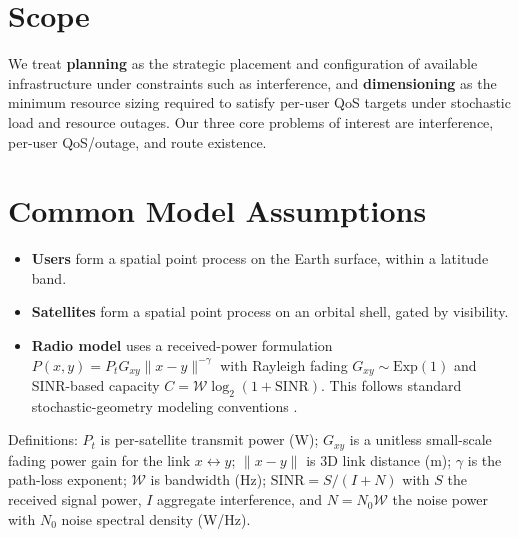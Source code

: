 
\section{Scope}
We treat \textbf{planning} as the strategic placement and configuration of available
infrastructure under constraints such as interference, and \textbf{dimensioning} as the
minimum resource sizing required to satisfy per-user QoS targets under stochastic
load and resource outages.
Our three core problems of interest are interference, per-user QoS/outage, and route existence.

\section{Common Model Assumptions}
\begin{itemize}
    \item \textbf{Users} form a spatial point process on the Earth surface, within
    a latitude band.
    \item \textbf{Satellites} form a spatial point process on an orbital shell,
    gated by visibility.
    \item \textbf{Radio model} uses a received-power formulation
    $P(x,y)=P_t G_{xy}\|x-y\|^{-\gamma}$ with Rayleigh fading
    $G_{xy}\sim \mathrm{Exp}(1)$ and SINR-based capacity $C=\mathcal{W}\log_2(1+\mathrm{SINR})$.
    This follows standard stochastic-geometry modeling conventions \cite{gomez2018stochastic}.
\end{itemize}

Definitions: $P_t$ is per-satellite transmit power (W); $G_{xy}$ is a unitless
small-scale fading power gain for the link $x\leftrightarrow y$; $\|x-y\|$ is
3D link distance (m); $\gamma$ is the path-loss exponent; $\mathcal{W}$ is bandwidth (Hz);
$\mathrm{SINR}=S/(I+N)$ with $S$ the received signal power, $I$ aggregate
interference, and $N=N_0\mathcal{W}$ the noise power with $N_0$ noise spectral density (W/Hz).


